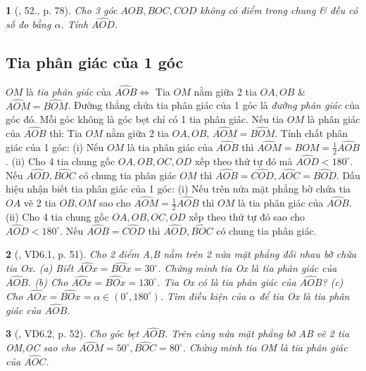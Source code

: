 \documentclass{article}
\newtheorem{baitoan}{}
\begin{document}
\begin{baitoan}[\cite{Binh_Toan_6_tap_2}, 52., p. 78]
	Cho 3 góc $AOB,BOC,COD$ không có điểm trong chung \& đều có số đo bằng $\alpha$. Tính $\widehat{AOD}$.
\end{baitoan}


\subsection{Tia phân giác của 1 góc}
 $OM$ là \textit{tia phân giác} của $\widehat{AOB}\Leftrightarrow$ Tia $OM$ nằm giữa 2 tia $OA,OB$ \& $\widehat{AOM} = \widehat{BOM}$. Đường thẳng chứa tia phân giác của 1 góc là \textit{đường phân giác} của góc đó. Mỗi góc không là góc bẹt chỉ có 1 tia phân giác.  Nếu tia $OM$ là phân giác của $\widehat{AOB}$ thì: Tia $OM$ nằm giữa 2 tia $OA,OB$, $\widehat{AOM} = \widehat{BOM}$.  {\sf Tính chất phân giác của 1 góc}: (i) Nếu $OM$ là tia phân giác của $\widehat{AOB}$ thì $\widehat{AOM} = \widehat{BOM} = \frac{1}{2}\widehat{AOB}$. (ii) Cho 4 tia chung gốc $OA,OB,OC,OD$ xếp theo thứ tự đó mà $\widehat{AOD} < 180^\circ$. Nếu $\widehat{AOD},\widehat{BOC}$ có chung tia phân giác $OM$ thì $\widehat{AOB} = \widehat{COD},\widehat{AOC} = \widehat{BOD}$.  {\sf Dấu hiệu nhận biết tia phân giác của 1 góc}: (i) Nếu trên nửa mặt phẳng bờ chứa tia $OA$ vẽ 2 tia $OB,OM$ sao cho $\widehat{AOM} = \frac{1}{2}\widehat{AOB}$ thì $OM$ là tia phân giác của $\widehat{AOB}$. (ii) Cho 4 tia chung gốc $OA,OB,OC,OD$ xếp theo thứ tự đó sao cho $\widehat{AOD} < 180^\circ$. Nếu $\widehat{AOB} = \widehat{COD}$ thì $\widehat{AOD},\widehat{BOC}$ có chung tia phân giác.

\begin{baitoan}[\cite{TLCT_THCS_Toan_6_hinh_hoc}, VD6.1, p. 51]
	Cho 2 điểm A,B nằm trên 2 nửa mặt phẳng đối nhau bờ chứa tia Ox. (a) Biết $\widehat{AOx} = \widehat{BOx} = 30^\circ$. Chứng minh tia Ox là tia phân giác của $\widehat{AOB}$. (b) Cho $\widehat{AOx} = \widehat{BOx} = 130^\circ$. Tia Ox có là tia phân giác của $\widehat{AOB}$? (c) Cho $\widehat{AOx} = \widehat{BOx} = \alpha\in(0^\circ,180^\circ)$. Tìm điều kiện của $\alpha$ để tia Ox là tia phân giác của $\widehat{AOB}$.
\end{baitoan}

\begin{baitoan}[\cite{TLCT_THCS_Toan_6_hinh_hoc}, VD6.2, p. 52]
	Cho góc bẹt $\widehat{AOB}$. Trên cùng nửa mặt phẳng bờ AB vẽ 2 tia OM,OC sao cho $\widehat{AOM} = 50^\circ,\widehat{BOC} = 80^\circ$. Chứng minh tia OM là tia phân giác của $\widehat{AOC}$.
\end{baitoan}
\end{document}
